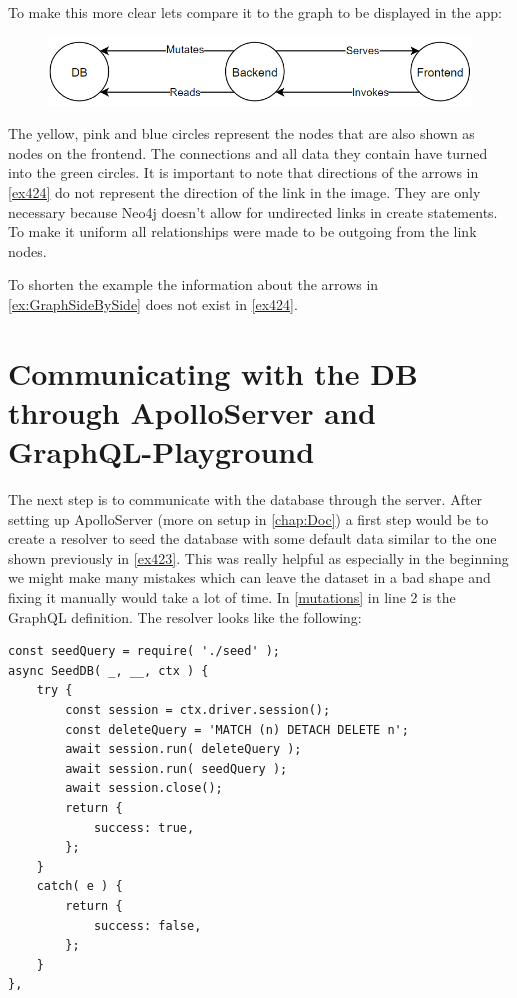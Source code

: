 To make this more clear lets compare it to the graph to be displayed in the app:
\begin{figure}[H]
\centering
\includegraphics[scale=.8]{Bilder/BasicGraph.png}
\label{ex:GraphSideBySide}
\end{figure}

The yellow, pink and blue circles represent the nodes that are also shown as nodes on the frontend. The connections and all data they contain have turned into the green circles. It is important to note that directions of the arrows in \autoref{ex424} do not represent the direction of the link in the image. They are only necessary because Neo4j doesn't allow for undirected links in create statements. To make it uniform all relationships were made to be outgoing from the link nodes.

To shorten the example the information about the arrows in \autoref{ex:GraphSideBySide} does not exist in \autoref{ex424}. 

\section{Communicating with the DB through ApolloServer and GraphQL-Playground}
The next step is to communicate with the database through the server. After setting up ApolloServer (more on setup in \autoref{chap:Doc}) a first step would be to create a resolver to seed the database with some default data similar to the one shown previously in \autoref{ex423}. This was really helpful as especially in the beginning we might make many mistakes which can leave the dataset in a bad shape and fixing it manually would take a lot of time. In \autoref{mutations} in line 2 is the GraphQL definition. The resolver looks like the following:
\lstset{language=JavaScript}
\begin{lstlisting}[caption={Seed Resolver}]
const seedQuery = require( './seed' );
async SeedDB( _, __, ctx ) {
	try {
		const session = ctx.driver.session();
		const deleteQuery = 'MATCH (n) DETACH DELETE n';
		await session.run( deleteQuery );
		await session.run( seedQuery );
		await session.close();
		return {
			success: true,
		};
	}
	catch( e ) {
		return {
			success: false,
		};	
	}
},
\end{lstlisting}

